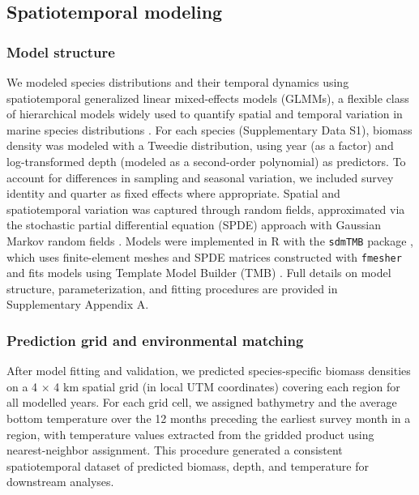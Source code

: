 \documentclass[9pt,twocolumn,twoside]{pnas-new}
\begin{document}
{\subsection*{Spatiotemporal modeling}\label{sec:Species spatiotemporal modeling}

\subsubsection*{Model structure} 
We modeled species distributions and their temporal dynamics using spatiotemporal generalized linear mixed-effects models (GLMMs), a flexible class of hierarchical models widely used to quantify spatial and temporal variation in marine species distributions \citep{thorson_geostatistical_2015, thorson_model-based_2016}. For each species (Supplementary Data S1), biomass density was modeled with a Tweedie distribution, using year (as a factor) and log-transformed depth (modeled as a second-order polynomial) as predictors. To account for differences in sampling and seasonal variation, we included survey identity and quarter as fixed effects where appropriate. Spatial and spatiotemporal variation was captured through random fields, approximated via the stochastic partial differential equation (SPDE) approach with Gaussian Markov random fields \citep{lindgren_explicit_2011}. Models were implemented in R with the \texttt{sdmTMB} package \citep{sdmTMB2025}, which uses finite-element meshes and SPDE matrices constructed with \texttt{fmesher} \citep{lindgren_fmesher_2025} and fits models using Template Model Builder (TMB) \citep{kristensen_tmb_2016}. Full details on model structure, parameterization, and fitting procedures are provided in Supplementary Appendix A.

\subsubsection*{Prediction grid and environmental matching} 
After model fitting and validation, we predicted species-specific biomass densities on a 4 × 4 km spatial
grid (in local UTM coordinates) covering each region for all modelled years. For each grid cell, we assigned bathymetry and the average bottom temperature over the 12 months preceding the earliest survey month in a region, with temperature values extracted from the gridded product using nearest-neighbor assignment. This procedure generated a consistent spatiotemporal dataset of predicted biomass, depth, and temperature for downstream analyses.

}
\end{document}
